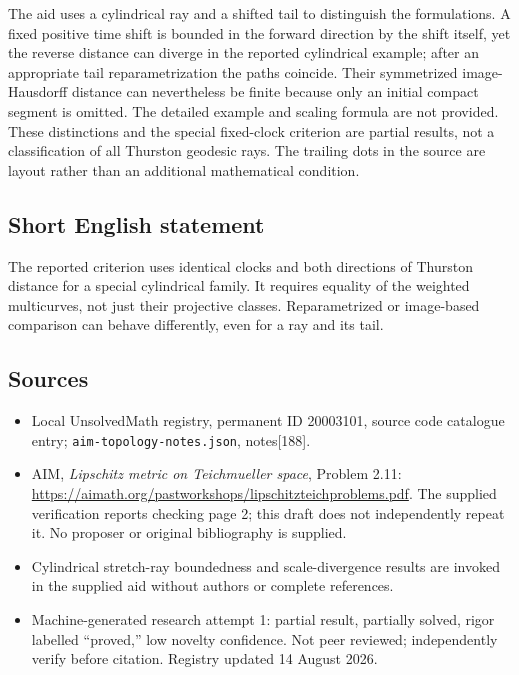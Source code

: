 \documentclass[11pt]{article}
\begin{document}
The aid uses a cylindrical ray and a shifted tail to distinguish the formulations. A fixed positive time shift is bounded in the forward direction by the shift itself, yet the reverse distance can diverge in the reported cylindrical example; after an appropriate tail reparametrization the paths coincide. Their symmetrized image-Hausdorff distance can nevertheless be finite because only an initial compact segment is omitted. The detailed example and scaling formula are not provided. These distinctions and the special fixed-clock criterion are partial results, not a classification of all Thurston geodesic rays. The trailing dots in the source are layout rather than an additional mathematical condition.
\subsection{Short English statement}
The reported criterion uses identical clocks and both directions of Thurston distance for a special cylindrical family. It requires equality of the weighted multicurves, not just their projective classes. Reparametrized or image-based comparison can behave differently, even for a ray and its tail.
\subsection{Sources}
\begin{itemize}
\item Local UnsolvedMath registry, permanent ID 20003101, source code catalogue entry; \texttt{aim-topology-notes.json}, notes[188].
\item AIM, \emph{Lipschitz metric on Teichmueller space}, Problem 2.11: \url{https://aimath.org/pastworkshops/lipschitzteichproblems.pdf}. The supplied verification reports checking page 2; this draft does not independently repeat it. No proposer or original bibliography is supplied.
\item Cylindrical stretch-ray boundedness and scale-divergence results are invoked in the supplied aid without authors or complete references.
\item Machine-generated research attempt 1: partial result, partially solved, rigor labelled ``proved,'' low novelty confidence. Not peer reviewed; independently verify before citation. Registry updated 14 August 2026.
\end{itemize}
\end{document}
